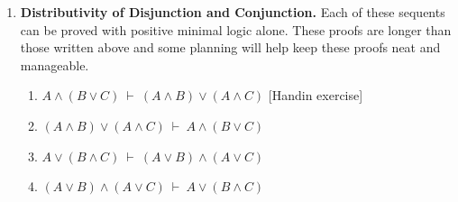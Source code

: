 \documentclass[11pt]{report}
\begin{document}
\begin{enumerate}
	\begin{enumerate}
		\item $A \to (B \to C) \ \vdash \ B \to (A \to C)$ \hfill [Handin exercise]
		\item $A \land B \ \vdash \ B \land A$
		\item $A \lor B \ \vdash \ B \lor A$ \hfill [Handin exercise]
		\item $( A\land  B) \rightarrow  C \vdash  A\rightarrow ( B \rightarrow  C) $ \hfill [Handin exercise]
		\item $A \rightarrow ( B \rightarrow  C) \vdash ( A\land  B) \rightarrow C$	 \hfill [Handin exercise]
		\item $A \to B \ \vdash A \to (B \lor C)$
		\item $ A\rightarrow  B, \  B \rightarrow  C \vdash  A\rightarrow  C $
		\item $ A\lor  B,\ \  A\to  C,\ \  B \to  D \vdash   C \lor  D$		
		\item $A \to B \ \vdash \ (C \to A) \to (C \to B)$	
		\item $(A \to B) \land (A \to C) \ \vdash \ A \to (B \land C)$
		\item $A \ \vdash \ ((A \to B) \to B$
		\item $((A \to B) \to B) \to B \ \vdash \ A \to B$
		\item $A \to B \ \vdash ((A \to B) \to B) \to B$
	\end{enumerate}	

	\item \textbf{Distributivity of Disjunction and Conjunction.} Each of these sequents can be proved with positive minimal logic alone. These proofs are longer than those written above and some planning will help keep these proofs neat and manageable. 

	\begin{enumerate}
		\item $A \land (B \lor C) \ \vdash \ (A \land B) \lor (A \land C)$ \hfill [Handin exercise]
		\item $(A \land B) \lor (A \land C) \ \vdash \ A \land (B \lor C)$
		\item $A \lor (B \land C) \ \vdash \ (A \lor B) \land (A \lor C)$
		\item $(A \lor B) \land (A \lor C) \ \vdash \ A \lor (B \land C)$
	\end{enumerate}



\end{enumerate}	
\end{document}
